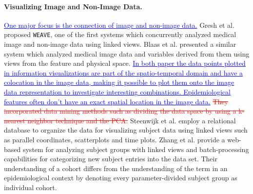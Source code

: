 \documentclass[journal]{style/vgtc} 			          %
\newcommand{\rem}[1]{\textcolor{red}{\sout{#1}}}
\newcommand{\add}[1]{\textcolor{blue}{\uline{#1}}}
\begin{document}
\paragraph{Visualizing Image and Non-Image Data.}
\add{One major focus is the connection of image and non-image data.}
Gresh et al. \cite{Gresh2000} proposed \texttt{WEAVE}, one of the first systems which concurrently analyzed medical image and non-image data using linked views.
%
%
Blaas et al. \cite{Blaas2007} presented a similar system which analyzed medical image data and variables derived from them using views from the feature and physical space.
\add{In both paper the data points plotted in information visualizations are part of the spatio-temporal domain and have a colocation in the image data, making it possible to plot them onto the image data representation to investigate interesting combinations.
%
Epidemiological features often don't have an exact spatial location in the image data.}
%
\rem{They incorporated data mining methods such as dividing the data space by using a k-nearest neighbor technique and the PCA.}
%
Steenwijk et al. \cite{Steenwijk2010} employ a relational database to organize the data for visualizing subject data using linked views such as parallel coordinates, scatterplots and time plots.
%
Zhang et al. \cite{Zhang2012} provide a web-based system for analyzing subject groups with linked views and batch-processing capabilities for categorizing new subject entries into the data set.
%
Their understanding of a cohort differs from the understanding of the term in an epidemiological context by denoting every parameter-divided subject group as individual cohort.
\end{document}
